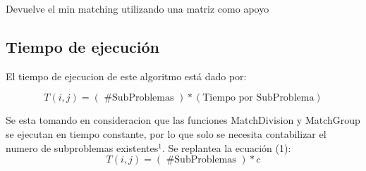 \documentclass{article}
\begin{document}
\newpage
\begin{algorithm}
\caption{Devuelve el min matching utilizando una matriz como apoyo}
\begin{algorithmic}[1]
    
    
    
    \Else
    \EndIf
    \EndFor
    
    \EndIf
    \EndFor
    
    \EndIf
\EndProcedure
\end{algorithmic}
\end{algorithm}

\subsection{Tiempo de ejecución}

El tiempo de ejecucion de este algoritmo está dado por:

\begin{equation}
T(i,j) = ( \text{ \# SubProblemas } ) * ( \text{Tiempo por SubProblema} )  
\end{equation}

Se esta tomando en consideracion que las funciones MatchDivision y MatchGroup se ejecutan en tiempo constante, por lo que solo se necesita contabilizar el numero de subproblemas existentes$^1$. Se replantea la ecuación (1):
\begin{equation}
T(i,j) = ( \text{ \# SubProblemas } ) * c
\end{equation}  
\end{document}
